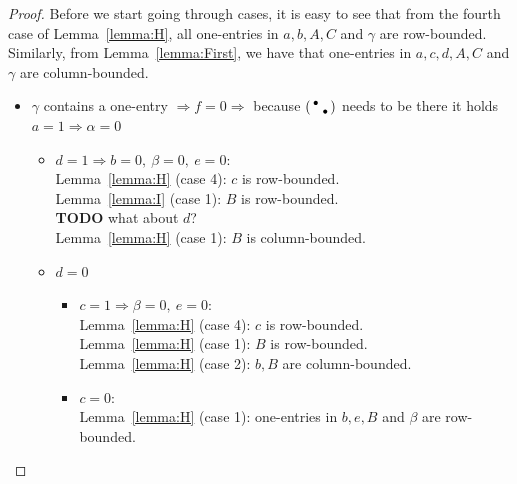 \begin{proof}
Before we start going through cases, it is easy to see that from the fourth case of Lemma~\ref{lemma:H}, all one-entries in $a,b,A,C$ and $\gamma$ are row-bounded. Similarly, from Lemma~\ref{lemma:First}, we have that one-entries in $a,c,d,A,C$ and $\gamma$ are column-bounded.
\begin{itemize}
	\item $\gamma$ contains a one-entry $\Rightarrow f=0\Rightarrow$ because $\left(\begin{smallmatrix}\bullet& \\ &\bullet\end{smallmatrix}\right)$ needs to be there it holds $a=1\Rightarrow\alpha=0$
		\begin{itemize}
			\item $d=1\Rightarrow b=0,\ \beta=0,\ e=0$:\\
				Lemma~\ref{lemma:H} (case 4): $c$ is row-bounded.\\
				Lemma~\ref{lemma:I} (case 1): $B$ is row-bounded.\\				
				\textbf{TODO} what about $d$?\\
				
				Lemma~\ref{lemma:H} (case 1): $B$ is column-bounded.
			\item $d=0$
				\begin{itemize}
					\item $c=1\Rightarrow\beta=0,\ e=0$:\\
						Lemma~\ref{lemma:H} (case 4): $c$ is row-bounded.\\
						Lemma~\ref{lemma:H} (case 1): $B$ is row-bounded.\\
						
						Lemma~\ref{lemma:H} (case 2): $b,B$ are column-bounded.
					\item $c=0$:\\
						Lemma~\ref{lemma:H} (case 1): one-entries in $b,e,B$ and $\beta$ are row-bounded.\\
						

\end{itemize}
\end{itemize}
\end{itemize}
\end{proof}
